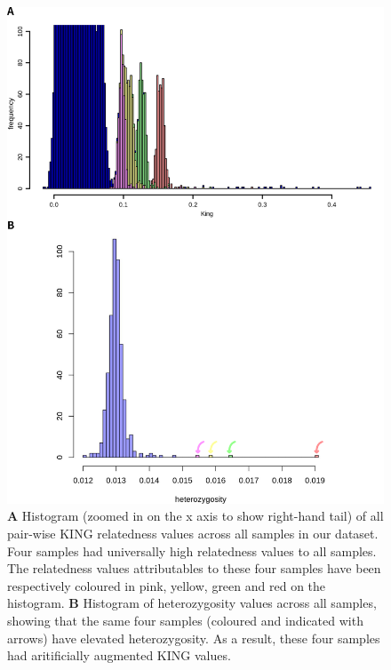 \documentclass[a4paper,12pt]{article}
\begin{document}
\begin{figure}[h]
	\begin{center}
		\includegraphics*[width = 15cm]{odd_samples.png}
		\caption{\footnotesize \textbf{A} Histogram (zoomed in on the x axis to show right-hand tail) of all pair-wise KING relatedness values across all samples in our dataset. Four samples had universally high relatedness values to all samples. The relatedness values attributables to these four samples have been respectively coloured in pink, yellow, green and red on the histogram. \textbf{B} Histogram of heterozygosity values across all samples, showing that the same four samples (coloured and indicated with arrows) have elevated heterozygosity. As a result, these four samples had aritificially augmented KING values.}
	\end{center}
	\label{FigS1}
\end{figure}


\clearpage
\end{document}
